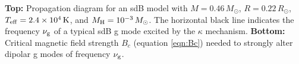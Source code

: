 \label{fig:sdBProp}
{\bf Top:} Propagation diagram for an sdB model with $M=0.46 \, M_\odot$, $R= 0.22 \, R_\odot$, $T_{\rm eff} = 2.4 \times 10^4 \, {\rm K}$, and $M_{\rm H} = 10^{-3} \, M_\odot$. The horizontal black line indicates the frequency $\nu_{\rm g}$ of a typical sdB g mode excited by the $\kappa$ mechanism. {\bf Bottom:} Critical magnetic field strength $B_c$ (equation \ref{eqn:Bc}) needed to strongly alter dipolar g modes of frequency $\nu_{\rm g}$. 
  
  
  
  